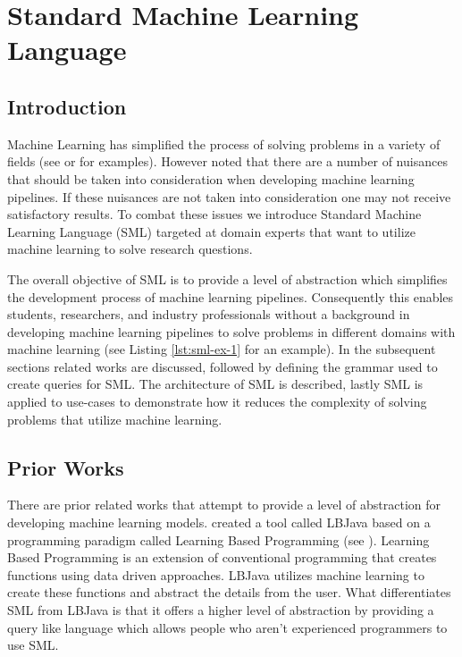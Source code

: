 \chapter{Standard Machine Learning Language}

\section{Introduction}
\label{Introduction}
Machine Learning has simplified the process of solving problems in a variety of fields (see \cite{ML-UseCase1} or \cite{Monahan} for examples).  However \cite{pedros:fewUsefulThings} noted that there are a number of nuisances that should be taken into consideration when developing machine learning pipelines.  If these nuisances are not taken into consideration one may not receive satisfactory results.  To combat these issues we introduce Standard Machine Learning Language (SML) targeted at domain experts that want to utilize machine learning to solve research questions.

The overall objective of SML is to provide a level of abstraction which simplifies the development process of machine learning pipelines.  Consequently this enables students, researchers, and industry professionals without a background in developing machine learning pipelines to solve problems in different domains with machine learning (see Listing \ref{lst:sml-ex-1} for an example).  In the subsequent sections related works are discussed,  followed by defining the grammar used to create queries for SML. The architecture of SML is described,  lastly SML is applied to use-cases to demonstrate how it reduces the complexity of solving problems that utilize machine learning.

\section{Prior Works}
\label{SML:PriorWorks}

There are prior related works that attempt to provide a level of abstraction for developing machine learning models.  \cite{RizzoloRo10} created a tool called LBJava based on a programming paradigm called Learning Based Programming (see \cite{Roth05}). Learning Based Programming is an extension of conventional programming that creates functions using data driven approaches.  LBJava utilizes machine learning to create these functions and abstract the details from the user.  What differentiates SML from LBJava is that it offers a higher level of abstraction by providing a query like language which allows people who aren't experienced programmers to use SML.  

